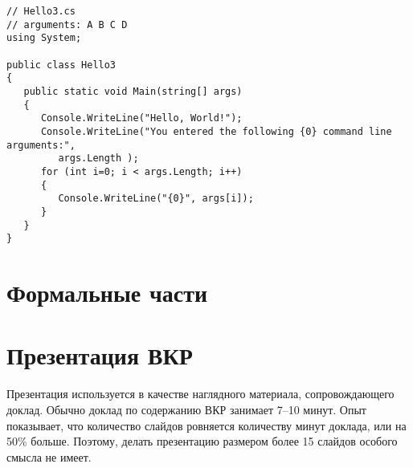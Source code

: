 \documentclass[a4paper,14pt,final]{extreport}
\begin{document}
\begin{verbatim}
// Hello3.cs
// arguments: A B C D
using System;

public class Hello3
{
   public static void Main(string[] args)
   {
      Console.WriteLine("Hello, World!");
      Console.WriteLine("You entered the following {0} command line arguments:",
         args.Length );
      for (int i=0; i < args.Length; i++)
      {
         Console.WriteLine("{0}", args[i]);
      }
   }
}
\end{verbatim}

\chapter{Формальные части}
\label{cha:formal}

\chapter{Презентация ВКР}
\label{cha:presentation}

Презентация используется в качестве наглядного материала, сопровождающего доклад.  Обычно доклад по содержанию ВКР занимает 7--10 минут.  Опыт показывает, что количество слайдов ровняется количеству минут доклада, или на 50\% больше.  Поэтому, делать презентацию размером более 15 слайдов особого смысла не имеет.
\end{document}
